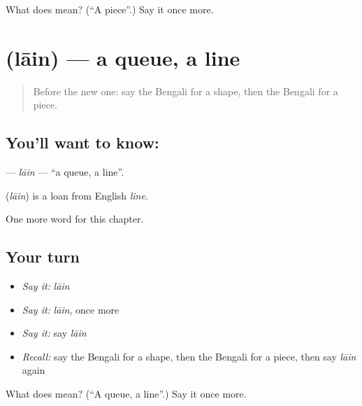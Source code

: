 \begin{tcolorbox}[breakable,colback=teal!4,colframe=teal!35!black,title={Before you move on}]
What does  mean? (\textquotedblleft{}A piece\textquotedblright{}.) Say it once more.
\end{tcolorbox}
\section[\texorpdfstring{\bn{লাইন} (lāin)}{লাইন (lāin)}]{ (lāin) — a queue, a line}

\label{lesson:BN-C170-lain}



\begin{quote}
Before the new one: say the Bengali for a shape, then the Bengali for a piece.
\end{quote}

\subsection*{You'll want to know: }
\textbf{} — \emph{lāin} — \textquotedblleft{}a queue, a line\textquotedblright{}.

\begin{cousinweb}
\textbf{} (\emph{lāin}) is a loan from English \emph{line}.
\end{cousinweb}

\begin{grammarlens}[title={What you've built}]
One more word for this chapter.
\end{grammarlens}

\subsection*{Your turn}
\begin{itemize}
\raggedright
  \item \emph{Say it:} \emph{lāin}
  \item \emph{Say it:} \emph{lāin}, once more
  \item \emph{Say it:} say \emph{lāin}
  \item \emph{Recall:} say the Bengali for a shape, then the Bengali for a piece, then say \emph{lāin} again
\end{itemize}

\begin{tcolorbox}[breakable,colback=teal!4,colframe=teal!35!black,title={Before you move on}]
What does  mean? (\textquotedblleft{}A queue, a line\textquotedblright{}.) Say it once more.
\end{tcolorbox}
